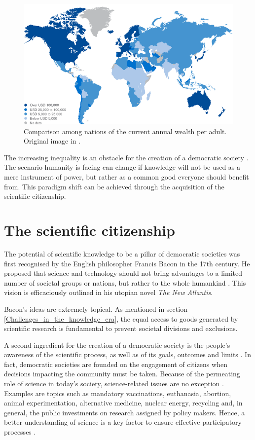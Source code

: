 \begin{figure}[!t] 
 \begin{center}
 \includegraphics[scale=0.44]{Images/World_wealth_levels.png}
 \caption{Comparison among nations of the current annual wealth per adult. Original image in \cite{Kersley}.}
 \label{World_wealth_levels}
 \end{center}
\end{figure}

The increasing inequality is an obstacle for the creation of a democratic society \cite{Mckenna}. The scenario humanity is facing can change if knowledge will not be used as a mere instrument of power, but rather as a common good everyone should benefit from. This paradigm shift can be achieved through the acquisition of the scientific citizenship.

\section{The scientific citizenship} \label{The_scientific_citizenship}
The potential of scientific knowledge to be a pillar of democratic societies was first recognised by the English philosopher Francis Bacon in the 17th century. He proposed that science and technology should not bring advantages to a limited number of societal groups or nations, but rather to the whole humankind \cite{Zagorin}. This vision is efficaciously outlined in his utopian novel \textit{The New Atlantis}.

Bacon's ideas are extremely topical. As mentioned in section \ref{Challenges_in_the_knowledge_era}, the equal access to goods generated by scientific research is fundamental to prevent societal divisions and exclusions.

A second ingredient for the creation of a democratic society is the people's awareness of the scientific process, as well as of its goals, outcomes and limits \cite{Gibbons}. In fact, democratic societies are founded on the engagement of citizens when decisions impacting the community must be taken. Because of the permeating role of science in today's society, science-related issues are no exception \cite{vanDijck}. Examples are topics such as mandatory vaccinations, euthanasia, abortion, animal experimentation, alternative medicine, nuclear energy, recycling and, in general, the public investments on research assigned by policy makers. Hence, a better understanding of science is a key factor to ensure effective participatory processes \cite{Shapin}.    


